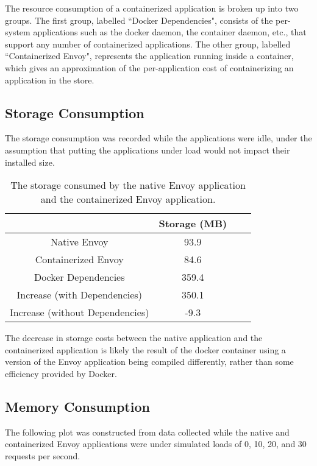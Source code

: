 \documentclass{article}
\begin{document}
The resource consumption of a containerized application is broken up into two groups. The first group, labelled ``Docker Dependencies", consists of the per-system applications such as the docker daemon, the container daemon, etc., that support any number of containerized applications. The other group, labelled ``Containerized Envoy", represents the application running inside a container, which gives an approximation of the per-application cost of containerizing an application in the store.

\subsection{Storage Consumption}
The storage consumption was recorded while the applications were idle, under the assumption that putting the applications under load would not impact their installed size.

\begin{table}[H]
\begin{tabular}{ |c|c|c|c| }
 \hline
   & Storage (MB)\\ 
 \hline
 Native Envoy & 93.9 \\
 \hline
 Containerized Envoy & 84.6 \\
 \hline
 Docker Dependencies & 359.4\\
 \hline\hline
 Increase (with Dependencies) & 350.1 \\
 \hline
 Increase (without Dependencies) & -9.3 \\
 \hline
\end{tabular}
\caption{The storage consumed by the native Envoy application and the containerized Envoy application.}
\label{storage-consumption}
\end{table}

The decrease in storage costs between the native application and the containerized application is likely the result of the docker container using a version of the Envoy application being compiled differently, rather than some efficiency provided by Docker.

\subsection{Memory Consumption}
The following plot was constructed from data collected while the native and containerized Envoy applications were under simulated loads of 0, 10, 20, and 30 requests per second.
\end{document}

